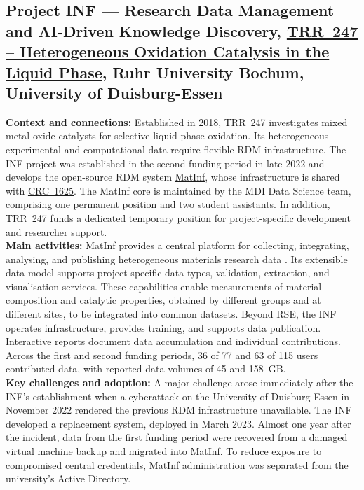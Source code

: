 \documentclass{eceasst}
\begin{document}
\subsection{Project INF --- Research Data Management and AI-Driven Knowledge Discovery,
\href{https://gepris.dfg.de/gepris/projekt/388390466?language=en}
{TRR~247 -- Heterogeneous Oxidation Catalysis in the Liquid Phase}, Ruhr University Bochum, University of Duisburg-Essen}
\label{subsec:trr247}
\noindent\textbf{Context and connections:}
Established in 2018, TRR~247 investigates mixed metal
oxide catalysts for selective liquid-phase oxidation.
Its heterogeneous experimental and computational data require flexible RDM infrastructure.
The INF project was established in
the second funding period in late 2022 and develops
the open-source RDM system
\href{https://matinf.pro/}{MatInf}, whose infrastructure
is shared with \hyperref[subsec:crc1625]{CRC~1625}.
The MatInf core is maintained by the MDI Data Science
team, comprising one permanent position and two student
assistants. In addition, TRR~247 funds a dedicated
temporary position for project-specific development
and researcher support.
\\
\noindent\textbf{Main activities:}
MatInf provides a central platform for collecting,
integrating, analysing, and publishing heterogeneous
materials research data \cite{Dudarev2025}.
Its extensible data model supports project-specific
data types, validation, extraction, and visualisation
services. These capabilities enable measurements
of material composition and catalytic properties,
obtained by different groups and at different sites,
to be integrated into common datasets.
Beyond RSE, the INF operates infrastructure, provides training, and supports data publication.
Interactive reports document data accumulation and individual contributions.
Across the first and second funding periods, 36 of 77 and 63 of
115 users contributed data, with reported data volumes of 45 and 158~GB.
\\
\noindent\textbf{Key challenges and adoption:}
A major challenge arose immediately after the INF's
establishment when a cyberattack on the University
of Duisburg-Essen in November 2022 rendered the previous RDM infrastructure unavailable.
The INF developed a replacement system, deployed in March 2023.
Almost one year after the incident,
data from the first funding period were recovered
from a damaged virtual machine backup and migrated into MatInf.
To reduce exposure to compromised central credentials, MatInf administration was separated from the university's Active Directory.
\end{document}
